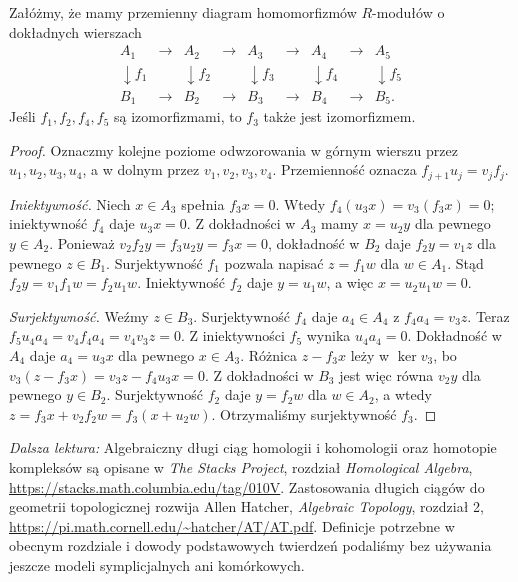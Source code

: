 \begin{lemat}
\label{lem:pieciu}
Załóżmy, że mamy przemienny diagram
homomorfizmów $R$-modułów o dokładnych
wierszach
\[
\begin{array}{ccccccccc}
A_1&\longrightarrow&A_2&\longrightarrow&A_3&
 \longrightarrow&A_4&\longrightarrow&A_5\\
\downarrow f_1&&\downarrow f_2&&\downarrow f_3&&
\downarrow f_4&&\downarrow f_5\\
B_1&\longrightarrow&B_2&\longrightarrow&B_3&
 \longrightarrow&B_4&\longrightarrow&B_5 .
\end{array}
\]
Jeśli $f_1,f_2,f_4,f_5$ są izomorfizmami,
to $f_3$ także jest izomorfizmem.
\end{lemat}
\begin{proof}
Oznaczmy kolejne poziome odwzorowania w górnym
wierszu przez $u_1,u_2,u_3,u_4$,
a w dolnym przez $v_1,v_2,v_3,v_4$.
Przemienność oznacza
$f_{j+1}u_j=v_jf_j$.

\emph{Iniektywność.} Niech $x\in A_3$
spełnia $f_3x=0$.
Wtedy
$f_4(u_3x)=v_3(f_3x)=0$;
iniektywność $f_4$ daje $u_3x=0$.
Z dokładności w $A_3$ mamy
$x=u_2y$ dla pewnego $y\in A_2$.
Ponieważ
$v_2f_2y=f_3u_2y=f_3x=0$,
dokładność w $B_2$ daje
$f_2y=v_1z$ dla pewnego $z\in B_1$.
Surjektywność $f_1$ pozwala napisać
$z=f_1w$ dla $w\in A_1$.
Stąd $f_2y=v_1f_1w=f_2u_1w$.
Iniektywność $f_2$ daje $y=u_1w$,
a więc $x=u_2u_1w=0$.

\emph{Surjektywność.} Weźmy $z\in B_3$.
Surjektywność $f_4$ daje $a_4\in A_4$
z $f_4a_4=v_3z$. Teraz
$f_5u_4a_4=v_4f_4a_4=v_4v_3z=0$.
Z iniektywności $f_5$ wynika
$u_4a_4=0$. Dokładność w $A_4$
daje $a_4=u_3x$ dla pewnego
$x\in A_3$. Różnica
$z-f_3x$ leży w $\ker v_3$,
bo $v_3(z-f_3x)=v_3z-f_4u_3x=0$.
Z dokładności w $B_3$ jest więc
równa $v_2y$ dla pewnego $y\in B_2$.
Surjektywność $f_2$ daje
$y=f_2w$ dla $w\in A_2$, a wtedy
$z=f_3x+v_2f_2w
=f_3(x+u_2w)$.
Otrzymaliśmy surjektywność $f_3$.
\end{proof}

\par\smallskip
{\footnotesize\noindent\emph{Dalsza lektura:}
Algebraiczny długi ciąg homologii i kohomologii
oraz homotopie kompleksów są opisane w
\emph{The Stacks Project}, rozdział
\emph{Homological Algebra},
\url{https://stacks.math.columbia.edu/tag/010V}.
Zastosowania długich ciągów do geometrii
topologicznej rozwija Allen Hatcher,
\emph{Algebraic Topology}, rozdział 2,
\url{https://pi.math.cornell.edu/~hatcher/AT/AT.pdf}.
Definicje potrzebne w obecnym rozdziale
i dowody podstawowych twierdzeń podaliśmy
bez używania jeszcze modeli
symplicjalnych ani komórkowych.\par}
\clearpage

